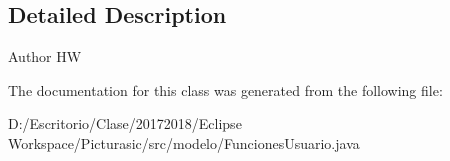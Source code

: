 \subsection{Detailed Description}
\begin{DoxyAuthor}{Author}
HW 
\end{DoxyAuthor}


The documentation for this class was generated from the following file\+:\begin{DoxyCompactItemize}
\item 
D\+:/\+Escritorio/\+Clase/20172018/\+Eclipse Workspace/\+Picturasic/src/modelo/Funciones\+Usuario.\+java\end{DoxyCompactItemize}
